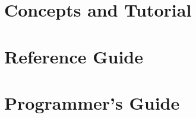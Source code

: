 \documentclass{book}
\begin{document}


{
\setlength{\parskip}{\dPar}
\setlength{\parindent}{0ex}


}

\tableofcontents
\listoffigures
\listoftables

\setlength{\parskip}{\dPar}
\setlength{\parindent}{0ex}

\part{Concepts and Tutorial}




\part{Reference Guide}
\label{ref-guide}







\part{Programmer's Guide}







\printindex
\end{document}

